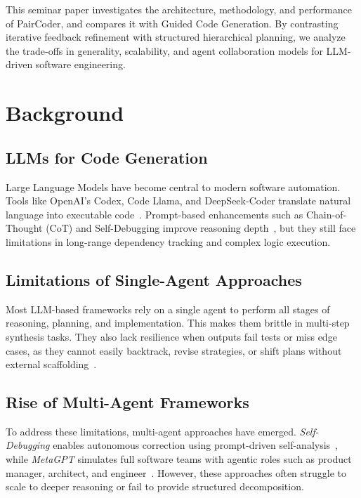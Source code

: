 \documentclass[11pt,a4paper]{article}
\begin{document}
This seminar paper investigates the architecture, methodology, and performance of PairCoder, and compares it with Guided Code Generation. By contrasting iterative feedback refinement with structured hierarchical planning, we analyze the trade-offs in generality, scalability, and agent collaboration models for LLM-driven software engineering.

\section{Background}

\subsection{LLMs for Code Generation}
Large Language Models have become central to modern software automation. Tools like OpenAI’s Codex, Code Llama, and DeepSeek-Coder translate natural language into executable code~\cite{zhang2024paircoder}. Prompt-based enhancements such as Chain-of-Thought (CoT) and Self-Debugging improve reasoning depth~\cite{chen2024selfdebugging}, but they still face limitations in long-range dependency tracking and complex logic execution.

\subsection{Limitations of Single-Agent Approaches}
Most LLM-based frameworks rely on a single agent to perform all stages of reasoning, planning, and implementation. This makes them brittle in multi-step synthesis tasks. They also lack resilience when outputs fail tests or miss edge cases, as they cannot easily backtrack, revise strategies, or shift plans without external scaffolding~\cite{zhang2024paircoder}.

\subsection{Rise of Multi-Agent Frameworks}
To address these limitations, multi-agent approaches have emerged. \textit{Self-Debugging} enables autonomous correction using prompt-driven self-analysis~\cite{chen2024selfdebugging}, while \textit{MetaGPT} simulates full software teams with agentic roles such as product manager, architect, and engineer~\cite{metagpt2023}. However, these approaches often struggle to scale to deeper reasoning or fail to provide structured decomposition.
\end{document}
